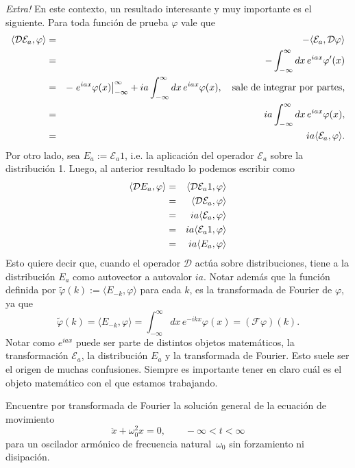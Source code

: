 \documentclass[11pt,spanish]{article}
\newcommand{\four}{\mathcal{F}}
\newcommand{\derv}{\mathcal{D}}
\newcommand{\phas}{\mathcal{E}}
\newcounter{problema}
\newcommand{\prob}{\stepcounter{problema} \vspace{.5cm} \noindent{\bf Problema \arabic{problema}: }}
\begin{document}
{\em Extra!}
En este contexto, un resultado interesante y muy importante es el siguiente.
Para toda funci\'on de prueba $\varphi$ vale que
\begin{eqnarray}
\langle \derv \phas_a , \varphi \rangle
&=&
-
\langle \phas_a , \derv \varphi \rangle
\notag
\\
&=&
-
\int_{-\infty}^{\infty}
dx\,
e^{iax}
\varphi'(x)
\notag
\\
&=&
-
\left.
e^{iax}
\varphi(x)
\right|_{-\infty}^{\infty}
+
ia
\int_{-\infty}^{\infty}
dx\,
e^{iax}
\varphi(x),
\notag
\quad \text{sale de integrar por partes,}
\\
&=&
ia
\int_{-\infty}^{\infty}
dx\,
e^{iax}
\varphi(x),
\notag
\\
&=&
ia
\langle \phas_a , \varphi \rangle
.
\notag
\end{eqnarray}
Por otro lado, sea $E_a := \phas_a 1$, i.e. la aplicaci\'on del operador $\phas_a$ sobre la distribuci\'on 1.
Luego, al anterior resultado lo podemos escribir como
\begin{eqnarray}
\langle \derv E_a, \varphi \rangle
&=&
\langle \derv \phas_a 1, \varphi \rangle
\notag
\\
&=&
\langle \derv \phas_a , \varphi \rangle
\notag
\\
&=&
ia
\langle \phas_a , \varphi \rangle
\notag
\\
&=&
ia
\langle \phas_a 1, \varphi \rangle
\notag
\\
&=&
ia
\langle E_a, \varphi \rangle
\notag
\end{eqnarray}
Esto quiere decir que, cuando el operador $\derv$ act\'ua sobre distribuciones, tiene a la distribuci\'on $E_a$ como autovector a autovalor $ia$.
Notar adem\'as que la funci\'on definida por $\tilde{\varphi}(k):=\langle E_{-k},\varphi \rangle$ para cada $k$, es la transformada de Fourier de $\varphi$, ya que
$$
\tilde{\varphi}(k)
=
\langle E_{-k},\varphi \rangle
=
\int_{-\infty}^{\infty}
dx\,
e^{-ikx} \varphi(x)
=
(\four \varphi)(k)
.
$$
Notar como $e^{iax}$ puede ser parte de distintos objetos matem\'aticos, la transformaci\'on $\phas_a$, la distribuci\'on $E_a$ y la transformada de Fourier.
Esto suele ser el origen de muchas confusiones.
Siempre es importante tener en claro cu\'al es el objeto matem\'atico con el que estamos trabajando.

\prob Encuentre por transformada de Fourier la soluci\'on general de la ecuaci\'on de movimiento
\[
\ddot{x} + \omega_0^2 x = 0, \qquad -\infty < t < \infty
\]
para un oscilador arm\'onico de frecuencia natural~$\omega_0$ sin forzamiento ni disipaci\'on.
\end{document}

